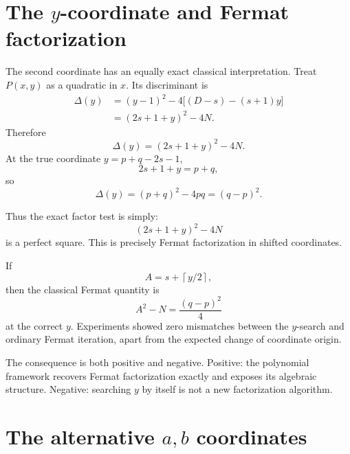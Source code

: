 \documentclass[11pt,a4paper]{article}
\newcommand{\ceil}[1]{\left\lceil #1 \right\rceil}
\begin{document}
\section{The \(y\)-coordinate and Fermat factorization}
\label{sec:fermat}

The second coordinate has an equally exact classical interpretation. Treat \(P(x,y)\) as a quadratic in \(x\). Its discriminant is
\begin{align}
\Delta(y)
&=(y-1)^2-4\bigl[(D-s)-(s+1)y\bigr]\\
&=(2s+1+y)^2-4N.
\end{align}
Therefore
\begin{equation}
\boxed{
\Delta(y)=(2s+1+y)^2-4N.
}
\label{eq:disc}
\end{equation}
At the true coordinate \(y=p+q-2s-1\),
\begin{equation}
2s+1+y=p+q,
\end{equation}
so
\begin{equation}
\boxed{
\Delta(y)=(p+q)^2-4pq=(q-p)^2.
}
\label{eq:gap}
\end{equation}

Thus the exact factor test is simply:
\begin{equation}
(2s+1+y)^2-4N
\end{equation}
is a perfect square. This is precisely Fermat factorization in shifted coordinates.

If
\[
A=s+\ceil{y/2},
\]
then the classical Fermat quantity is
\begin{equation}
A^2-N=\frac{(q-p)^2}{4}
\end{equation}
at the correct \(y\). Experiments showed zero mismatches between the \(y\)-search and ordinary Fermat iteration, apart from the expected change of coordinate origin.

The consequence is both positive and negative. Positive: the polynomial framework recovers Fermat factorization exactly and exposes its algebraic structure. Negative: searching \(y\) by itself is not a new factorization algorithm.

\section{The alternative \(a,b\) coordinates}
\label{sec:ab}
\end{document}

